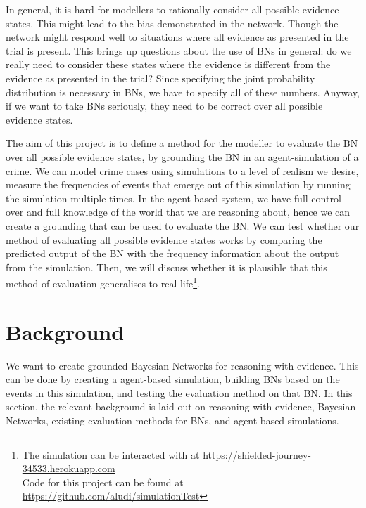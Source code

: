 \documentclass[12pt]{article}
\begin{document}
In general, it is hard for modellers to rationally consider all possible evidence states. This might lead to the bias demonstrated in the network. Though the network might respond well to situations where all evidence as presented in the trial is present. This brings up questions about the use of BNs in general: do we really need to consider these states where the evidence is different from the evidence as presented in the trial? Since specifying the joint probability distribution is necessary in BNs, we have to specify all of these numbers. Anyway, if we want to take BNs seriously, they need to be correct over all possible evidence states.

 The aim of this project is to define a method for the modeller to evaluate the BN over all possible evidence states, by grounding the BN in an agent-simulation of a crime. We can model crime cases using simulations to a level of realism we desire, measure the frequencies of events that emerge out of this simulation by running the simulation multiple times. In the agent-based system, we have full control over and full knowledge of the world that we are reasoning about, hence we can create a grounding that can be used to evaluate the BN. We can test whether our method of evaluating all possible evidence states works by comparing the predicted output of the BN with the frequency information about the output from the simulation. Then, we will discuss whether it is plausible that this method of evaluation generalises to real life\footnote{The simulation can be interacted with at \url{https://shielded-journey-34533.herokuapp.com} \\ Code for this project can be found at \url{https://github.com/aludi/simulationTest}}.

\newpage

\section{Background}

We want to create grounded Bayesian Networks for reasoning with evidence. This can be done by creating a agent-based simulation, building BNs based on the events in this simulation, and testing the evaluation method on that BN. In this section, the relevant background is laid out on reasoning with evidence, Bayesian Networks, existing evaluation methods for BNs, and agent-based simulations.
\end{document}

